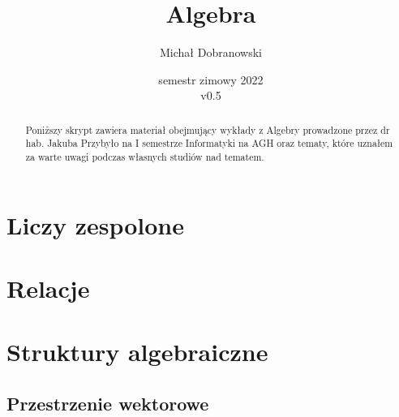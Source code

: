 \documentclass[11pt]{scrartcl}
\title{Algebra}
\author{Michał Dobranowski}
\date{semestr zimowy 2022 \\ v0.5}
\begin{document}
    \maketitle
    \begin{abstract}
        Poniższy skrypt zawiera materiał obejmujący wykłady z Algebry prowadzone przez dr hab. Jakuba Przybyło na I semestrze Informatyki na AGH oraz tematy, które uznałem za warte uwagi podczas własnych studiów nad tematem.
    \end{abstract}
    \tableofcontents
    \eject

    \section{Liczy zespolone}
    

    \section{Relacje}
    

    \section{Struktury algebraiczne}
    

    \subsection{Przestrzenie wektorowe}
    
\end{document}
